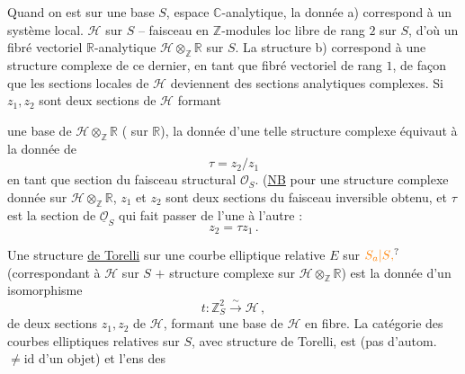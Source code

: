 Quand on est sur une base $S$, espace $\mathbb{C}$-analytique, la donnée a) correspond à un système local. $\mathscr{H}$ sur $S$ -- faisceau en $\mathbb{Z}$-modules loc libre de rang $2$ sur $S$, d'où un fibré vectoriel $\mathbb{R}$-analytique $\mathscr{H}\otimes_{\mathbb{Z}}\mathbb{R}$ sur $S$. La structure b) correspond à une structure complexe  de ce dernier, en tant que fibré vectoriel  de rang $1$, de façon que les sections locales de $\mathscr{H}$ deviennent des sections analytiques complexes. Si  $z_1,z_2$ sont deux sections de $\mathscr{H}$ formant


une base de $\mathscr{H}\otimes_{\mathbb{Z}}\mathbb{R}$ ( sur $\mathbb{R}$), la donnée d'une telle structure complexe équivaut à la donnée de
\[
\tau=z_2/z_1
\tag*{(3)}
\]
en tant que section du faisceau structural $\mathcal{O}_S$. (\uline{NB}  pour une structure complexe donnée sur $\mathscr{H}\otimes_{\mathbb{Z}}\mathbb{R}$, $z_1$ et $z_2$ sont deux sections du faisceau inversible obtenu, et $\tau$ est la section de $\underline{\mathcal{O}}_S$ qui fait passer de l'une à l'autre :
\[
z_2=\tau z_1\,.
\tag*{(3 bis)}
\]

Une structure \uline{de Torelli} sur une  courbe elliptique relative $E$ sur $\unsure{S_a|S{,}}$ (correspondant à $\mathscr{H}$ sur $S$ $+$ structure complexe sur $\mathscr{H}\otimes_{\mathbb{Z}}\mathbb{R}$) est la donnée d'un isomorphisme
\[
t:\mathbb{Z}_S^2\xrightarrow{\sim}\mathscr{H}\,,
\tag*{(4)}
\]
  de deux sections $z_1,z_2$ de $\mathscr{H}$,  formant une base de $\mathscr{H}$ en  fibre. La catégorie des courbes elliptiques relatives sur $S$, avec structure de Torelli, est   (pas d'autom. $\ne\mathrm{id}$ d'un objet) et l'ens des

